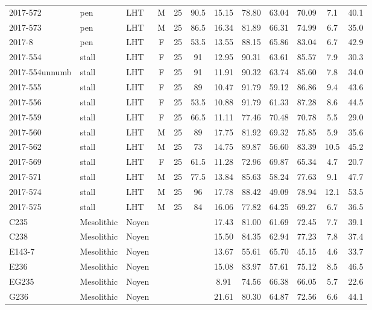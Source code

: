 \documentclass[12pt,a4paper]{article}
\begin{document}
\begin{landscape}
\begin{table}[!htbp]
\begin{tabular}{@{}lllccccccccc@{}}
    2017-572 & pen & LHT & M & 25 & 90.5 & 15.15 & 78.80 & 63.04 & 70.09 & 7.1 & 40.1 \\
    2017-573 & pen & LHT & M & 25 & 86.5 & 16.34 & 81.89 & 66.31 & 74.99 & 6.7 & 35.0 \\
    2017-8 & pen & LHT & F & 25 & 53.5 & 13.55 & 88.15 & 65.86 & 83.04 & 6.7 & 42.9 \\
    2017-554 & stall & LHT & F & 25 & 91 & 12.95 & 90.31 & 63.61 & 85.57 & 7.9 & 30.3 \\
    2017-554unnumb & stall & LHT & F & 25 & 91 & 11.91 & 90.32 & 63.74 & 85.60 & 7.8 & 34.0 \\
    2017-555 & stall & LHT & F & 25 & 89 & 10.47 & 91.79 & 59.12 & 86.86 & 9.4 & 43.6 \\
    2017-556 & stall & LHT & F & 25 & 53.5 & 10.88 & 91.79 & 61.33 & 87.28 & 8.6 & 44.5 \\
    2017-559 & stall & LHT & F & 25 & 66.5 & 11.11 & 77.46 & 70.48 & 70.78 & 5.5 & 29.0 \\
    2017-560 & stall & LHT & M & 25 & 89 & 17.75 & 81.92 & 69.32 & 75.85 & 5.9 & 35.6 \\
    2017-562 & stall & LHT & M & 25 & 73 & 14.75 & 89.87 & 56.60 & 83.39 & 10.5 & 45.2 \\
    2017-569 & stall & LHT & F & 25 & 61.5 & 11.28 & 72.96 & 69.87 & 65.34 & 4.7 & 20.7 \\
    2017-571 & stall & LHT & M & 25 & 77.5 & 13.84 & 85.63 & 58.24 & 77.63 & 9.1 & 47.7 \\
    2017-574 & stall & LHT & M & 25 & 96 & 17.78 & 88.42 & 49.09 & 78.94 & 12.1 & 53.5 \\
    2017-575 & stall & LHT & M & 25 & 84 & 16.06 & 77.82 & 64.25 & 69.27 & 6.7 & 36.5 \\
    C235 & Mesolithic & Noyen & ~ & ~ & ~ & 17.43 & 81.00 & 61.69 & 72.45 & 7.7 & 39.1 \\
    C238 & Mesolithic & Noyen & ~ & ~ & ~ & 15.50 & 84.35 & 62.94 & 77.23 & 7.8 & 37.4 \\
    E143-7 & Mesolithic & Noyen & ~ & ~ & ~ & 13.67 & 55.61 & 65.70 & 45.15 & 4.6 & 33.7 \\
    E236 & Mesolithic & Noyen & ~ & ~ & ~ & 15.08 & 83.97 & 57.61 & 75.12 & 8.5 & 46.5 \\
    EG235 & Mesolithic & Noyen & ~ & ~ & ~ & 8.91 & 74.56 & 66.38 & 66.05 & 5.7 & 22.6 \\
    G236 & Mesolithic & Noyen & ~ & ~ & ~ & 21.61 & 80.30 & 64.87 & 72.56 & 6.6 & 44.1 \\

\end{tabular}
\end{table}
\end{landscape}
\end{document}
